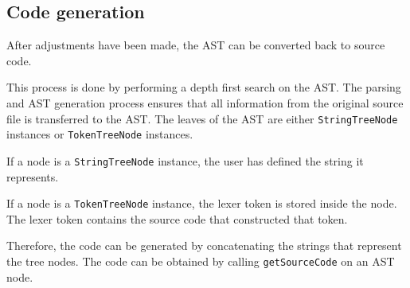
\subsection{Code generation}

After adjustments have been made, the AST can be converted back to source code.

This process is done by performing a depth first search on the AST.
The parsing and AST generation process ensures that all information from the original source file is transferred to the AST.
The leaves of the AST are either \verb|StringTreeNode| instances or \verb|TokenTreeNode| instances.

If a node is a \verb|StringTreeNode| instance, the user has defined the string it represents.

If a node is a \verb|TokenTreeNode| instance, the lexer token is stored inside the node. The lexer token contains the source code that constructed that token.

Therefore, the code can be generated by concatenating the strings that represent the tree nodes. The code can be obtained by calling \verb|getSourceCode| on an AST node.